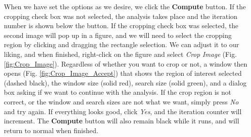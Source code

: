 \documentclass[letterpaper,12pt]{article}
\begin{document}
When we have set the options as we desire, we click the \textcolor{myBlue}{\textbf{Compute}} button.  If the cropping check box was not selected, the analysis takes place and the iteration number is shown below the button.  If the cropping check box was selected, the second image will pop up in a figure, and we will need to select the cropping region by clicking and dragging the rectangle selection.  We can adjust it to our liking, and when finished, right-click on the figure and select \textit{Crop Image} (Fig. \ref{fig:Crop_Image}).  Regardless of whether you want to crop or not, a window then opens (Fig. \ref{fig:Crop_Image_Accept}) that shows the region of interest selected (dashed black), the window size (solid red), search size (solid green), and a dialog box asking if we want to continue with the analysis.  If the crop region is not correct, or the window and search sizes are not what we want, simply press \textit{No} and try again.  If everything looks good, click \textit{Yes}, and the iteration counter will increment.  The \textcolor{myBlue}{\textbf{Compute}} button will also remain black while it runs, and will return to normal when finished.
\end{document}
